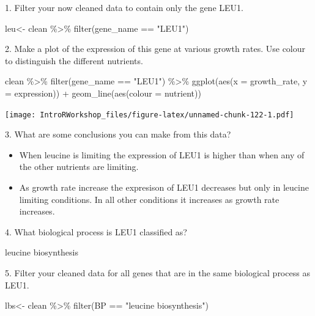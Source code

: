 \documentclass[
]{book}
\newenvironment{Shaded}{\begin{snugshade}}{\end{snugshade}}
\newcommand{\AttributeTok}[1]{\textcolor[rgb]{0.77,0.63,0.00}{#1}}
\newcommand{\FunctionTok}[1]{\textcolor[rgb]{0.00,0.00,0.00}{#1}}
\newcommand{\NormalTok}[1]{#1}
\newcommand{\OtherTok}[1]{\textcolor[rgb]{0.56,0.35,0.01}{#1}}
\newcommand{\SpecialCharTok}[1]{\textcolor[rgb]{0.00,0.00,0.00}{#1}}
\newcommand{\StringTok}[1]{\textcolor[rgb]{0.31,0.60,0.02}{#1}}
\providecommand{\tightlist}{%
  \setlength{\itemsep}{0pt}\setlength{\parskip}{0pt}}
\begin{document}
1. Filter your now cleaned data to contain only the gene LEU1.

\begin{Shaded}
\begin{Highlighting}[]
\NormalTok{leu}\OtherTok{\textless{}{-}}\NormalTok{ clean }\SpecialCharTok{\%\textgreater{}\%}
  \FunctionTok{filter}\NormalTok{(gene\_name }\SpecialCharTok{==} \StringTok{"LEU1"}\NormalTok{)}
\end{Highlighting}
\end{Shaded}

2. Make a plot of the expression of this gene at various growth rates. Use colour to distinguish the different nutrients.

\begin{Shaded}
\begin{Highlighting}[]
\NormalTok{clean }\SpecialCharTok{\%\textgreater{}\%}
  \FunctionTok{filter}\NormalTok{(gene\_name }\SpecialCharTok{==} \StringTok{"LEU1"}\NormalTok{) }\SpecialCharTok{\%\textgreater{}\%}
  \FunctionTok{ggplot}\NormalTok{(}\FunctionTok{aes}\NormalTok{(}\AttributeTok{x =}\NormalTok{ growth\_rate, }\AttributeTok{y =}\NormalTok{ expression)) }\SpecialCharTok{+}
    \FunctionTok{geom\_line}\NormalTok{(}\FunctionTok{aes}\NormalTok{(}\AttributeTok{colour =}\NormalTok{ nutrient))}
\end{Highlighting}
\end{Shaded}

\texttt{[image: IntroRWorkshop\_files/figure-latex/unnamed-chunk-122-1.pdf]}

3. What are some conclusions you can make from this data?

\begin{itemize}
\tightlist
\item
  When leucine is limiting the expression of LEU1 is higher than when any of the other nutrients are limiting.
\item
  As growth rate increase the expresison of LEU1 decreases but only in leucine limiting conditions. In all other conditions it increases as growth rate increases.
\end{itemize}

4. What biological process is LEU1 classified as?

leucine biosynthesis

5. Filter your cleaned data for all genes that are in the same biological process as LEU1.

\begin{Shaded}
\begin{Highlighting}[]
\NormalTok{lbs}\OtherTok{\textless{}{-}}\NormalTok{ clean }\SpecialCharTok{\%\textgreater{}\%}
  \FunctionTok{filter}\NormalTok{(BP }\SpecialCharTok{==} \StringTok{"leucine biosynthesis"}\NormalTok{)}
\end{Highlighting}
\end{Shaded}
\end{document}
